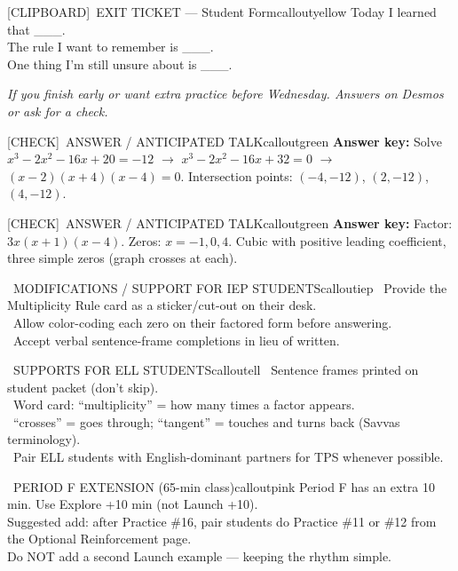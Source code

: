 \documentclass[11pt]{article}
\newcommand{\IconCheck}{[CHECK]}
\newcommand{\IconClipboard}{[CLIPBOARD]}
\newcommand{\teacheranswerbox}[2]{%
  \begin{callout}{#1}{calloutgreen}
  #2
  \end{callout}
}
\begin{document}
\begin{callout}{\IconClipboard\ EXIT TICKET --- Student Form}{calloutyellow}
Today I learned that \_\_\_.\\
The rule I want to remember is \_\_\_.\\
One thing I'm still unsure about is \_\_\_.
\end{callout}

\textit{If you finish early or want extra practice before Wednesday. Answers on Desmos or ask for a check.}


\teacheranswerbox{\IconCheck\ ANSWER / ANTICIPATED TALK}{%
\textbf{Answer key:} Solve \(x^3-2x^2-16x+20=-12\) \(\rightarrow\) \(x^3-2x^2-16x+32=0\) \(\rightarrow\) \((x-2)(x+4)(x-4)=0\). Intersection points: \((-4,-12)\), \((2,-12)\), \((4,-12)\).
}


\teacheranswerbox{\IconCheck\ ANSWER / ANTICIPATED TALK}{%
\textbf{Answer key:} Factor: \(3x(x+1)(x-4)\). Zeros: \(x=-1, 0, 4\). Cubic with positive leading coefficient, three simple zeros (graph crosses at each).
}

\clearpage

\begin{callout}{\IconPuzzle\ MODIFICATIONS / SUPPORT FOR IEP STUDENTS}{calloutiep}
\textbullet\ Provide the Multiplicity Rule card as a sticker/cut-out on their desk.\\
\textbullet\ Allow color-coding each zero on their factored form before answering.\\
\textbullet\ Accept verbal sentence-frame completions in lieu of written.
\end{callout}

\begin{callout}{\IconGlobe\ SUPPORTS FOR ELL STUDENTS}{calloutell}
\textbullet\ Sentence frames printed on student packet (don't skip).\\
\textbullet\ Word card: ``multiplicity'' = how many times a factor appears.\\
\textbullet\ ``crosses'' = goes through; ``tangent'' = touches and turns back (Savvas terminology).\\
\textbullet\ Pair ELL students with English-dominant partners for TPS whenever possible.
\end{callout}

\begin{callout}{\IconClock\ PERIOD F EXTENSION (65-min class)}{calloutpink}
Period F has an extra 10 min. Use Explore +10 min (not Launch +10).\\
Suggested add: after Practice \#16, pair students do Practice \#11 or \#12 from the Optional Reinforcement page.\\
Do NOT add a second Launch example --- keeping the rhythm simple.
\end{callout}
\end{document}
